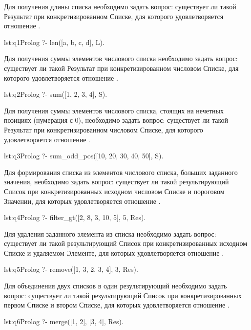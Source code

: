 Для получения длины списка необходимо задать вопрос: 
существует ли такой Результат при конкретизированном Списке, для которого 
удовлетворяется отношение .

\begin{listing}{lst:q1}{Prolog}
?- len([a, b, c, d], L).
\end{listing}

Для получения суммы элементов числового списка необходимо задать 
вопрос: существует ли такой Результат при конкретизированном числовом 
Списке, для которого удовлетворяется отношение .

\begin{listing}{lst:q2}{Prolog}
?- sum([1, 2, 3, 4], S).
\end{listing}

Для получения суммы элементов числового списка, стоящих на 
нечетных позициях (нумерация с 0), необходимо задать вопрос: 
существует ли такой Результат при конкретизированном 
числовом Списке, для которого удовлетворяется 
отношение .

\begin{listing}{lst:q3}{Prolog}
?- sum_odd_pos([10, 20, 30, 40, 50], S).
\end{listing}

Для формирования списка из элементов числового списка, больших 
заданного значения, необходимо задать вопрос: существует ли такой 
результирующий Список при конкретизированных исходном числовом Списке 
и пороговом Значении, для которых удовлетворяется отношение .

\begin{listing}{lst:q4}{Prolog}
?- filter_gt([2, 8, 3, 10, 5], 5, Res).
\end{listing}

Для удаления заданного элемента из списка необходимо задать вопрос: 
существует ли такой результирующий Список при конкретизированных 
исходном Списке и удаляемом Элементе, для которых удовлетворяется 
отношение .

\begin{listing}{lst:q5}{Prolog}
?- remove([1, 3, 2, 3, 4], 3, Res).
\end{listing}

Для объединения двух списков в один результирующий необходимо 
задать вопрос: существует ли такой результирующий Список при 
конкретизированных первом Списке и втором Списке, для которых 
удовлетворяется отношение .

\begin{listing}{lst:q6}{Prolog}
?- merge([1, 2], [3, 4], Res).
\end{listing}